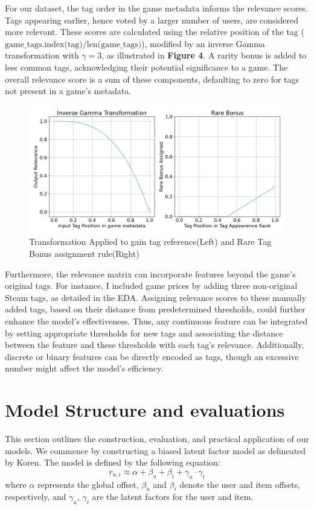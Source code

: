 \documentclass[sigplan,screen]{acmart}
\begin{document}
For our dataset, the tag order in the game metadata informs the relevance scores. Tags appearing earlier, hence voted by a larger number of users, are considered more relevant. These scores are calculated using the relative position of the tag ($\text{game\_tags.index(tag)} / \text{len(game\_tags)}$), modified by an inverse Gamma transformation with $\gamma=3$, as illustrated in \textbf{Figure 4}. A rarity bonus is added to less common tags, acknowledging their potential significance to a game. The overall relevance score is a sum of these components, defaulting to zero for tags not present in a game’s metadata.

\begin{figure}[h]
  \centering
  \includegraphics[width=\linewidth]{transformation.png}
  \caption{Transformation Applied to gain tag reference(Left) and Rare Tag Bonus assignment rule(Right)}
\end{figure}

Furthermore, the relevance matrix can incorporate features beyond the game's original tags. For instance, I included game prices by adding three non-original Steam tags, as detailed in the EDA. Assigning relevance scores to these manually added tags, based on their distance from predetermined thresholds, could further enhance the model's effectiveness. Thus, any continuous feature can be integrated by setting appropriate thresholds for new tags and associating the distance between the feature and these thresholds with each tag’s relevance. Additionally, discrete or binary features can be directly encoded as tags, though an excessive number might affect the model’s efficiency.

\section{Model Structure and evaluations}
This section outlines the construction, evaluation, and practical application of our models. We commence by constructing a biased latent factor model as delineated by Koren\cite{Koren09}. The model is defined by the following equation:
\begin{equation}
  r_{u,i} \approx \alpha + \beta_u + \beta_i + \gamma_u \cdot \gamma_i
\end{equation}
where \(\alpha\) represents the global offset, \(\beta_u\) and \(\beta_i\) denote the user and item offsets, respectively, and \(\gamma_u\), \(\gamma_i\) are the latent factors for the user and item.
\end{document}
